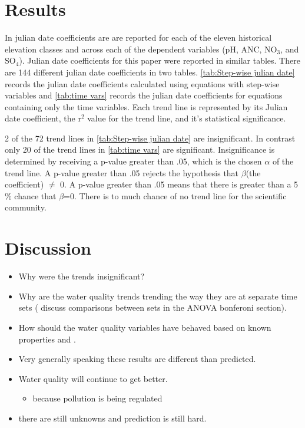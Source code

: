 \section{Results}
In \citet{robinson2008ph} julian date coefficients are are reported for each of the eleven historical elevation classes and across each of the dependent variables (pH, ANC, NO$_3$, and SO$_4$).  Julian date coefficients for this paper were reported in similar tables.  There are 144 different julian date coefficients in two tables.  \autoref{tab:Step-wise julian date} records the julian date coefficients calculated using equations with step-wise variables and \autoref{tab:time vars} records the julian date coefficients for  equations containing only the time variables.  Each trend line is represented by its Julian date coefficient, the r$^2$ value for the trend line, and it's statistical significance.

2 of the 72 trend lines in \autoref{tab:Step-wise julian date} are insignificant.  In contrast only 20 of the trend lines in \autoref{tab:time vars} are significant.   Insignificance is determined  by receiving a p-value greater than .05, which is the chosen $\alpha$ of the trend line.  A p-value greater than .05 rejects the hypothesis that $\beta$(the coefficient) $\neq$ 0.  A p-value greater than .05 means that there is greater than a 5$\%$ chance that $\beta$=0.  There is to much chance of no trend line for the scientific community.

\section{Discussion}
\begin{itemize}
	\item Why were the trends insignificant?
	\item Why are the water quality trends trending the way they are at separate time sets ( discuss comparisons between sets in the ANOVA bonferoni section).
	\item How should the water quality variables have behaved based on known properties and \citep{robinson2008ph}.
	\item Very generally speaking these results are different than \citep{robinson2008ph} predicted.
	\item Water quality will continue to get better.
	\begin{itemize}
		\item because pollution is being regulated
	\end{itemize}
	\item there are still unknowns and prediction is still hard.
\end{itemize}
	
